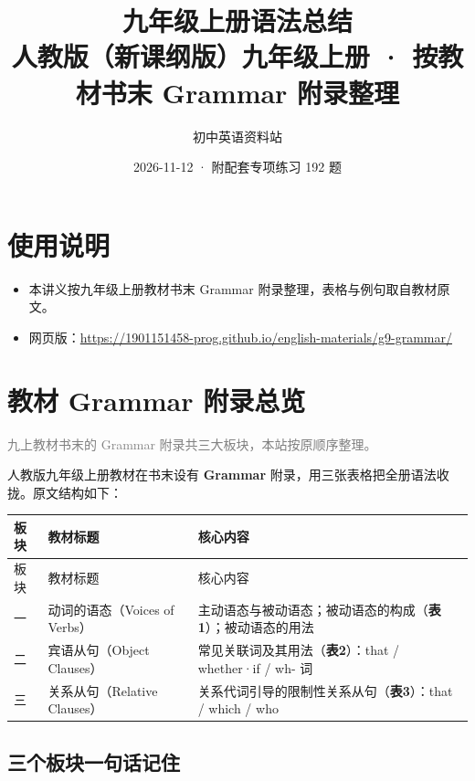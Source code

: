 \documentclass[11pt,a4paper]{ctexart}
\title{\textbf{九年级上册语法总结}\\[4pt]
\large 人教版（新课纲版）九年级上册 · 按教材书末 Grammar 附录整理}
\author{初中英语资料站}
\date{2026-11-12 · 附配套专项练习 192 题}
\begin{document}
\maketitle
\section*{使用说明}
\begin{itemize}[leftmargin=1.4em]
\item 本讲义按九年级上册教材书末 Grammar 附录整理，表格与例句取自教材原文。
\item 网页版：\url{https://1901151458-prog.github.io/english-materials/g9-grammar/}
\end{itemize}

\section{教材 Grammar 附录总览}
\noindent\textcolor{gray}{九上教材书末的 Grammar 附录共三大板块，本站按原顺序整理。}\par\smallskip
人教版九年级上册教材在书末设有 \textbf{Grammar} 附录，用三张表格把全册语法收拢。原文结构如下：

{\footnotesize
\begin{longtable}{p{4.47cm}p{4.47cm}p{4.47cm}}
\hline
板块 & 教材标题 & 核心内容 \\
\hline
\endfirsthead
\hline
板块 & 教材标题 & 核心内容 \\
\hline
\endhead
\hline
\endfoot
一 & 动词的语态（Voices of Verbs） & 主动语态与被动语态；被动语态的构成（\textbf{表1}）；被动语态的用法 \\
二 & 宾语从句（Object Clauses） & 常见关联词及其用法（\textbf{表2}）：that / whether·if / wh- 词 \\
三 & 关系从句（Relative Clauses） & 关系代词引导的限制性关系从句（\textbf{表3}）：that / which / who \\
\end{longtable}
}

\begin{center}\end{center}

\subsection*{三个板块一句话记住}
\end{document}
